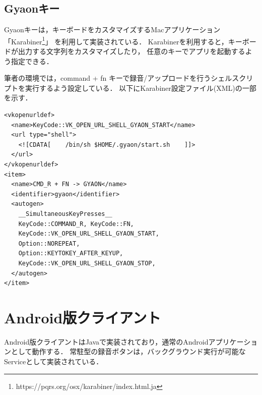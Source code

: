 
%

\subsection{Gyaonキー}

Gyaonキーは，キーボードをカスタマイズするMacアプリケーション
「Karabiner\footnote{\textsf{https://pqrs.org/osx/karabiner/index.html.ja}}」
を利用して実装されている．
Karabinerを利用すると，キーボードが出力する文字列をカスタマイズしたり，
任意のキーでアプリを起動するよう指定できる．

筆者の環境では，command + fn キーで録音/アップロードを行うシェルスクリプトを実行するよう設定している．
以下にKarabiner設定ファイル(XML)の一部を示す．

\vspace{4mm}
\begin{lstlisting}
<vkopenurldef>
  <name>KeyCode::VK_OPEN_URL_SHELL_GYAON_START</name>
  <url type="shell">
    <![CDATA[    /bin/sh $HOME/.gyaon/start.sh    ]]>
  </url>
</vkopenurldef>
<item>
  <name>CMD_R + FN -> GYAON</name>
  <identifier>gyaon</identifier>
  <autogen>
    __SimultaneousKeyPresses__
    KeyCode::COMMAND_R, KeyCode::FN,
    KeyCode::VK_OPEN_URL_SHELL_GYAON_START,
    Option::NOREPEAT,
    Option::KEYTOKEY_AFTER_KEYUP,
    KeyCode::VK_OPEN_URL_SHELL_GYAON_STOP,
  </autogen>
</item>
\end{lstlisting}


\section{Android版クライアント}
Android版クライアントはJavaで実装されており，通常のAndroidアプリケーションとして動作する．
常駐型の録音ボタンは，バックグラウンド実行が可能なServiceとして実装されている．

